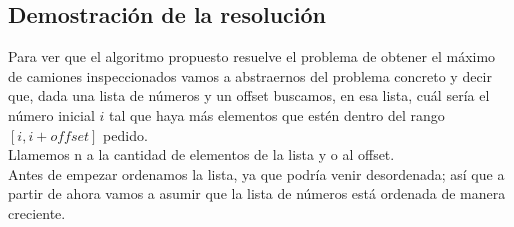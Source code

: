 \subsection{Demostraci\'on de la resoluci\'on}

Para ver que el algoritmo propuesto resuelve el problema de obtener el m\'aximo de camiones inspeccionados vamos a abstraernos del problema concreto y decir que, dada una lista de n\'umeros y un offset buscamos, en esa lista, cu\'al ser\'ia el n\'umero inicial $i$ tal que haya m\'as elementos que est\'en dentro del rango $[i, i+offset]$ pedido.\\
Llamemos n a la cantidad de elementos de la lista y o al offset. \\

Antes de empezar ordenamos la lista, ya que podr\'ia venir desordenada; as\'i que a partir de ahora vamos a asumir que la lista de n\'umeros est\'a ordenada de manera creciente. \\ \\

